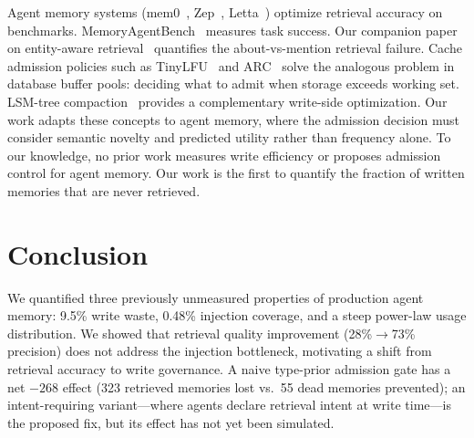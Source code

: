 \documentclass[11pt]{article}
\begin{document}
Agent memory systems (mem0~\cite{mem0}, Zep~\cite{zep}, Letta~\cite{letta}) optimize retrieval accuracy on benchmarks. MemoryAgentBench~\cite{mab} measures task success. Our companion paper on entity-aware retrieval~\cite{aoc} quantifies the about-vs-mention retrieval failure. Cache admission policies such as TinyLFU~\cite{tinylfu} and ARC~\cite{arc} solve the analogous problem in database buffer pools: deciding what to admit when storage exceeds working set. LSM-tree compaction~\cite{lsm} provides a complementary write-side optimization. Our work adapts these concepts to agent memory, where the admission decision must consider semantic novelty and predicted utility rather than frequency alone. To our knowledge, no prior work measures write efficiency or proposes admission control for agent memory. Our work is the first to quantify the fraction of written memories that are never retrieved.
\section{Conclusion}

We quantified three previously unmeasured properties of production agent memory: 9.5\% write waste, 0.48\% injection coverage, and a steep power-law usage distribution. We showed that retrieval quality improvement (28\%$\to$73\% precision) does not address the injection bottleneck, motivating a shift from retrieval accuracy to write governance. A naive type-prior admission gate has a net $-268$ effect (323 retrieved memories lost vs.\ 55 dead memories prevented); an intent-requiring variant---where agents declare retrieval intent at write time---is the proposed fix, but its effect has not yet been simulated.
\end{document}
